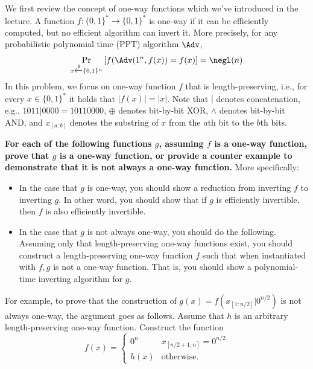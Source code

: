 \begin{problem}\label{p_4}
We first review the concept of one-way functions which we've introduced in the lecture. A function $f\colon \{0,1\}^*\to\{0,1\}^*$ is one-way if it can be efficiently computed, but no efficient algorithm can invert it. More precisely, for any probabilistic polynomial time (PPT) algorithm $\Adv$, 
\begin{equation*}
    \Pr_{x\xleftarrow{\$}\{0,1\}^n}\left[f(\Adv(1^n, f(x)) = f(x)\right]=\negl(n)
\end{equation*}
In this problem, we focus on one-way function $f$ that is length-preserving, 
i.e., for every $x \in \{0, 1\}^*$ it holds that $|f(x)| = |x|$. 
Note that $|$ denotes concatenation, e.g., $1011|0000 = 10110000$, $\oplus$ denotes bit-by-bit XOR,
$\land$ denotes bit-by-bit AND, and $x_{[a:b]}$ denotes the substring of $x$ from the $a$th bit to the $b$th bits.


\textbf{For each of the following functions $g$, assuming $f$ is a one-way function, prove that $g$ is a one-way function, or 
provide a counter example to demonstrate that it is not always a one-way function.} 
More specifically:

\begin{itemize}
\item In the case that $g$ is one-way, you should show a reduction from inverting $f$ to inverting $g$. In other word, you should show that if $g$ is efficiently invertible, then $f$ is also efficiently invertible.
\item In the case that $g$ is not always one-way, you should do the following. 
Assuming only that length-preserving one-way functions exist, 
you should construct a length-preserving one-way function $f$ such that 
when instantiated with $f, g$ is not a one-way function. 
That is, you should show a polynomial-time inverting algorithm for $g$.
\end{itemize}

For example, to prove that the construction of $g(x) = f(x_{[1:n/2]}|0^{n/2})$ is not always one-way, 
the argument goes as follows. Assume that $h$ is an arbitrary length-preserving one-way function. 
Construct the function
\begin{equation*}
  f(x) =
  \begin{cases}
    0^{n} & x_{[n/2+1,n]}=0^{n/2} \\
    h(x) & \text{otherwise}. 
  \end{cases}
\end{equation*}


\end{problem}
